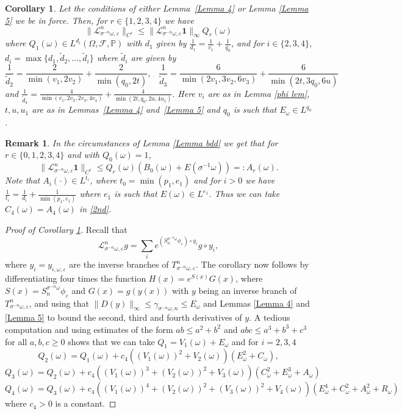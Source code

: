 \documentclass[11pt,reqno,a4paper]{article}
\newtheorem{cor}[theorem]{Corollary}
\theoremstyle{special}
\newtheorem{remark}[theorem]{Remark}
\def\om{\omega}
\begin{document}
\begin{cor}\label{Aux Cor}
Let the  conditions of either
Lemma~\ref{Lemma 4} or Lemma \ref{Lemma 5} we  be in force.
Then, for $r \in \{1,2,3,4 \}$ we have
$$ 
\|\mathcal L_{\sigma^{-n}\om,\varepsilon}^n\|_{C^r} \leq \|\mathcal L_{\sigma^{-n}\om,\varepsilon}^n\textbf{1}\|_\infty Q_r(\om)
$$
where $Q_1(\om)\in L^{d_i}(\Omega,\mathcal F,\mathbb P)$ with $d_1$ given by $\frac1{d_1}=\frac{1}{v_1}+\frac{1}{q_0}$, and for $i\in\{2,3,4\}$, $d_i=\max\{d_1,\tilde d_2, \ldots ,\tilde d_i\}
$
where $\tilde d_i$ are given by
$$
\frac{1}{\tilde d_2}=\frac{2}{\min(v_1,2v_2)}+\frac{2}{\min(q_0, 2t)},\,\,\,\,\,\frac{1}{\tilde d_3}=\frac{6}{\min(2v_1,3v_2,6v_3)}+\frac{6}{\min(2t,3q_0,6u)}
$$
and 
$
\frac{1}{\tilde d_4}=\frac{4}{\min(v_1,2v_2,2v_3,4v_4)}+\frac{4}{\min(2t,q_0,2u,4u_1)}.
$
Here $v_i$ are as in Lemma \ref{phi lem}, $t,u,u_1$ are as in Lemmas~\ref{Lemma 4} and~\ref{Lemma 5} and $q_0$ is such that $E_\om\in L^{q_0}$.
\end{cor}
\begin{remark}\label{Rem C4}
In the circumstances of  Lemma \ref{Lemma bdd} 
we get that  for $r\in \{0, 1, 2, 3, 4\}$ and with $Q_0(\om)=1$,
\begin{equation}\label{Norm bounds}
\|\mathcal L_{\sigma^{-n}\om, \varepsilon}^n \mathbf 1 \|_{C^r}\leq Q_r(\om)(B_0(\om)+E(\sigma^{-1}\om))=:A_r(\om).  
\end{equation}
Note that $A_i(\cdot)\in L^{t_i}$, where $t_0=\min(p_1,e_1)$ and for $i>0$ we have $\frac{1}{t_i}=\frac1{d_i}+\frac{1}{\min(p_1,e_1)}$ where $e_1$ is such that $E(\om)\in L^{e_1}$.  Thus we can take $C_4(\om)=A_4(\om)$ in \eqref{2nd}.
\end{remark}
\begin{proof}[Proof of Corollary \ref{Aux Cor}]
Recall that 
$$
\mathcal L_{\sigma^{-n}\om,\varepsilon}^n g=\sum_{i}e^{(S_n^{\sigma^{-n}\om}\phi_\varepsilon)\circ y_i}g\circ y_{i},
$$
where $y_{i}=y_{i,\om,\varepsilon}$ are the inverse branches of $T_{\sigma^{-n}\om,\varepsilon}^n$. 
The corollary now follows 
by differentiating four times the function
$H(x)=e^{S(x)}G(x)$, where
 $S(x)=S_{n}^{\sigma^{-n}\om}\phi_{\varepsilon}$ and $G(x)=g(y(x))$  with $y$ being an inverse branch of $T_{\sigma^{-n}\om,\varepsilon}^n$, and using that $\|D(y)\|_\infty\leq \gamma_{\sigma^{-n}\om,n}\leq E_\om$ and Lemmas \ref{Lemma 4} and \ref{Lemma 5} to bound the second, third and fourth derivatives  of $y$. 
A tedious computation and using estimates of the form $ab\leq a^2+b^2$ and $abc\leq a^3+b^3+c^3$ for all $a,b,c\geq 0$
shows that we can take
 $Q_1=V_1(\om)+E_\om$ and for $i=2,3,4$ 
$$
Q_2(\om)=Q_1(\om)+c_4\left((V_1(\om))^2+V_2(\om)\right)(E_\om^2+C_\om),
$$
$$
Q_3(\om)=Q_2(\om)+c_4\left((V_1(\om))^3+(V_2(\om))^2+V_3(\om)\right)(C_\om^2+E_\om^3+A_\om)
$$
$$
Q_4(\om)=Q_3(\om)+c_4\left((V_1(\om))^4+(V_2(\om))^2+(V_3(\om))^2+V_4(\om)\right)(E_\om^4+C_\om^2+A_\om^2+R_\om)
$$
where $c_4>0$ is a constant.
\end{proof}
\end{document}
